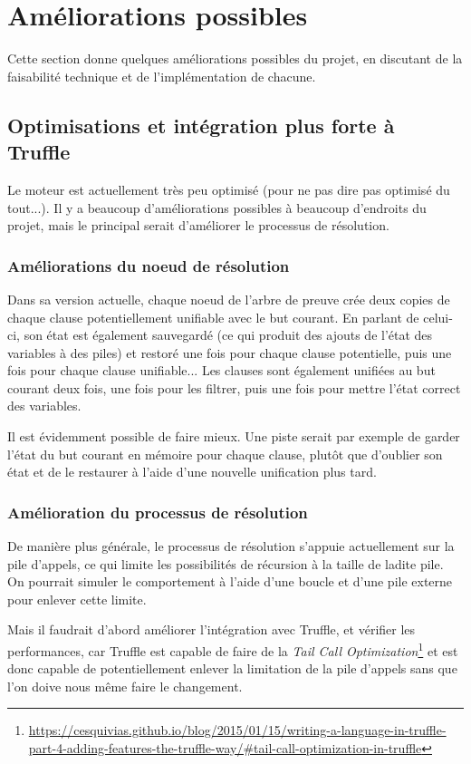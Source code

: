 \documentclass[../report.tex]{subfiles}
\begin{document}
\section{Améliorations possibles}
Cette section donne quelques améliorations possibles du projet, en discutant de la faisabilité technique et de l'implémentation de chacune.
\subsection{Optimisations et intégration plus forte à Truffle}
Le moteur est actuellement très peu optimisé (pour ne pas dire pas optimisé du tout...). Il y a beaucoup d'améliorations possibles à beaucoup d'endroits du projet, mais le principal serait d'améliorer le processus de résolution.
\subsubsection{Améliorations du noeud de résolution}
Dans sa version actuelle, chaque noeud de l'arbre de preuve crée deux copies de chaque clause potentiellement unifiable avec le but courant. En parlant de celui-ci, son état est également sauvegardé (ce qui produit des ajouts de l'état des variables à des piles) et restoré une fois pour chaque clause potentielle, puis une fois pour chaque clause unifiable... Les clauses sont également unifiées au but courant deux fois, une fois pour les filtrer, puis une fois pour mettre l'état correct des variables.

Il est évidemment possible de faire mieux. Une piste serait par exemple de garder l'état du but courant en mémoire pour chaque clause, plutôt que d'oublier son état et de le restaurer à l'aide d'une nouvelle unification plus tard.
\subsubsection{Amélioration du processus de résolution}
De manière plus générale, le processus de résolution s'appuie actuellement sur la pile d'appels, ce qui limite les possibilités de récursion à la taille de ladite pile. On pourrait simuler le comportement à l'aide d'une boucle et d'une pile externe pour enlever cette limite.

Mais il faudrait d'abord améliorer l'intégration avec Truffle, et vérifier les performances, car Truffle est capable de faire de la \textit{Tail Call Optimization}\footnote{\href{https://cesquivias.github.io/blog/2015/01/15/writing-a-language-in-truffle-part-4-adding-features-the-truffle-way/\#tail-call-optimization-in-truffle}{https://cesquivias.github.io/blog/2015/01/15/writing-a-language-in-truffle-part-4-adding-features-the-truffle-way/\#tail-call-optimization-in-truffle}} et est donc capable de potentiellement enlever la limitation de la pile d'appels sans que l'on doive nous même faire le changement.
\end{document}
